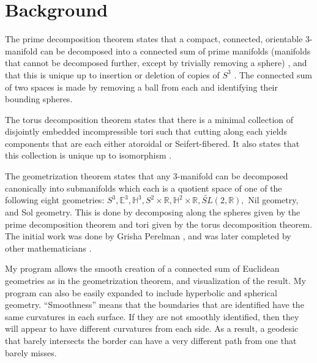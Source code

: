 \section{Background}

The prime decomposition theorem states that a compact, connected, orientable 3-manifold can be decomposed into a connected sum of prime manifolds (manifolds that cannot be decomposed further, except by trivially removing a sphere) \cite{Kneser}, and that this is unique up to insertion or deletion of copies of $S^3$ \cite{Milnor}. The connected sum of two spaces is made by removing a ball from each and identifying their bounding spheres.
  

The torus decomposition theorem states that there is a minimal collection of disjointly embedded incompressible tori such that cutting along each yields components that are each either atoroidal or Seifert-fibered. It also states that this collection is unique up to isomorphism \cite{JSJ3} \cite{JSJ2} \cite{JSJ1} \cite{JSJ4}.



The geometrization theorem states that any 3-manifold can be decomposed canonically into submanifolds which each is a quotient space of one of the following eight geometries: $S^3, \mathbb{E}^3, \mathbb{H}^3, S^2 \times \mathbb{R}, \mathbb{H}^2 \times \mathbb{R}, \tilde{SL}(2,\mathbb{R}),$ Nil geometry, and Sol geometry. This is done by decomposing along the spheres given by the prime decomposition theorem and tori given by the torus decomposition theorem. The initial work was done by Grisha Perelman \cite{Perelman1} \cite{Perelman3} \cite{Perelman2}, and was later completed by other mathematicians \cite{Geometrization1} \cite{Geometrization2} \cite{Geometrization3}.


My program allows the smooth creation of a connected sum of Euclidean geometries as in the geometrization theorem, and visualization of the result. My program can also be easily expanded to include hyperbolic and spherical geometry. ``Smoothness'' means that the boundaries that are identified have the same curvatures in each surface. If they are not smoothly identified, then they will appear to have different curvatures from each side. As a result, a geodesic that barely intersects the border can have a very different path from one that barely misses.

